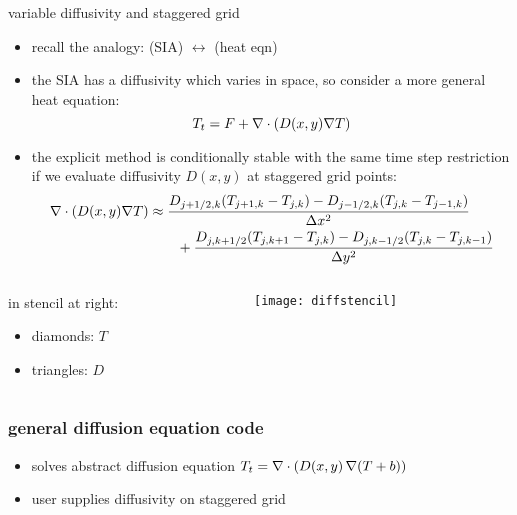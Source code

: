 \begin{frame}{variable diffusivity and staggered grid}

\begin{itemize}
  \item recall the analogy: \qquad (SIA) $\leftrightarrow$ (heat eqn)
  \item the SIA has a diffusivity which varies in space, so consider a more general heat equation:
  		$$T_t = F + \nabla\cdot \left(D(x,y) \nabla T\right)$$
  \item the explicit method is conditionally stable with the same time step restriction if we evaluate diffusivity $D(x,y)$ at \alert{staggered} grid points:
  \scriptsize\vspace{-4mm}
\begin{align*}
\nabla\cdot \left(D(x,y) \nabla T\right) &\approx \frac{D_{j+1/2,k}(T_{j+1,k} - T_{j,k}) - D_{j-1/2,k}(T_{j,k} - T_{j-1,k})}{\Delta x^2} \\
	&\qquad + \frac{D_{j,k+1/2}(T_{j,k+1} - T_{j,k}) - D_{j,k-1/2}(T_{j,k} - T_{j,k-1})}{\Delta y^2}
\end{align*}
\end{itemize}

\small
\begin{columns}
\begin{column}{0.5\textwidth}
in stencil at right:
\begin{itemize}
\item[] diamonds: $T$
\item[] triangles: $D$
\end{itemize}
\end{column}
\begin{column}{0.5\textwidth}
\hfill\texttt{[image: diffstencil]}
\end{column}
\end{columns}
\end{frame}


\begin{frame}
  \frametitle{general diffusion equation code}


\small
\begin{itemize}
\item solves abstract diffusion equation $T_t = \nabla\cdot \left(D(x,y)\, \nabla (T+b)\right)$
\item user supplies diffusivity on staggered grid
\end{itemize}
\end{frame}


